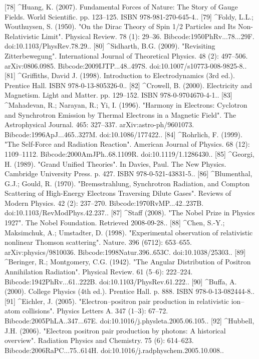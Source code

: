 [78]
^Huang, K. (2007). Fundamental Forces of Nature: The Story of Gauge Fields. World Scientific. pp. 123–125. ISBN 978-981-270-645-4..
[79]
^Foldy, L.L.; Wouthuysen, S. (1950). "On the Dirac Theory of Spin 1/2 Particles and Its Non-Relativistic Limit". Physical Review. 78 (1): 29–36. Bibcode:1950PhRv...78...29F. doi:10.1103/PhysRev.78.29..
[80]
^Sidharth, B.G. (2009). "Revisiting Zitterbewegung". International Journal of Theoretical Physics. 48 (2): 497–506. arXiv:0806.0985. Bibcode:2009IJTP...48..497S. doi:10.1007/s10773-008-9825-8..
[81]
^Griffiths, David J. (1998). Introduction to Electrodynamics (3rd ed.). Prentice Hall. ISBN 978-0-13-805326-0..
[82]
^Crowell, B. (2000). Electricity and Magnetism. Light and Matter. pp. 129–152. ISBN 978-0-9704670-4-1..
[83]
^Mahadevan, R.; Narayan, R.; Yi, I. (1996). "Harmony in Electrons: Cyclotron and Synchrotron Emission by Thermal Electrons in a Magnetic Field". The Astrophysical Journal. 465: 327–337. arXiv:astro-ph/9601073. Bibcode:1996ApJ...465..327M. doi:10.1086/177422..
[84]
^Rohrlich, F. (1999). "The Self-Force and Radiation Reaction". American Journal of Physics. 68 (12): 1109–1112. Bibcode:2000AmJPh..68.1109R. doi:10.1119/1.1286430..
[85]
^Georgi, H. (1989). "Grand Unified Theories". In Davies, Paul. The New Physics. Cambridge University Press. p. 427. ISBN 978-0-521-43831-5..
[86]
^Blumenthal, G.J.; Gould, R. (1970). "Bremsstrahlung, Synchrotron Radiation, and Compton Scattering of High-Energy Electrons Traversing Dilute Gases". Reviews of Modern Physics. 42 (2): 237–270. Bibcode:1970RvMP...42..237B. doi:10.1103/RevModPhys.42.237..
[87]
^Staff (2008). "The Nobel Prize in Physics 1927". The Nobel Foundation. Retrieved 2008-09-28..
[88]
^Chen, S.-Y.; Maksimchuk, A.; Umstadter, D. (1998). "Experimental observation of relativistic nonlinear Thomson scattering". Nature. 396 (6712): 653–655. arXiv:physics/9810036. Bibcode:1998Natur.396..653C. doi:10.1038/25303..
[89]
^Beringer, R.; Montgomery, C.G. (1942). "The Angular Distribution of Positron Annihilation Radiation". Physical Review. 61 (5–6): 222–224. Bibcode:1942PhRv...61..222B. doi:10.1103/PhysRev.61.222..
[90]
^Buffa, A. (2000). College Physics (4th ed.). Prentice Hall. p. 888. ISBN 978-0-13-082444-8..
[91]
^Eichler, J. (2005). "Electron–positron pair production in relativistic ion–atom collisions". Physics Letters A. 347 (1–3): 67–72. Bibcode:2005PhLA..347...67E. doi:10.1016/j.physleta.2005.06.105..
[92]
^Hubbell, J.H. (2006). "Electron positron pair production by photons: A historical overview". Radiation Physics and Chemistry. 75 (6): 614–623. Bibcode:2006RaPC...75..614H. doi:10.1016/j.radphyschem.2005.10.008..

